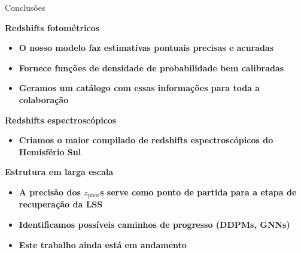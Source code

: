 
\begin{frame}[c]{Conclusões}
    \small
    \vspace*{0.2cm}
    \begin{splusbox}{\textbf{Redshifts fotométricos}}
        \begin{itemize}
            \setlength\itemsep{.1em}
            \item \textbf{O nosso modelo faz estimativas pontuais precisas e acuradas}
            \item \textbf{Fornece funções de densidade de probabilidade bem calibradas}
            \item \textbf{Geramos um catálogo com essas informações para toda a colaboração}
        \end{itemize}
    \end{splusbox}
    
    \begin{splusbox}{\textbf{Redshifts espectroscópicos}}
        \begin{itemize}
            \setlength\itemsep{.1em}
            \item \textbf{Criamos o maior compilado de redshifts espectroscópicos do Hemisfério Sul}
        \end{itemize}
    \end{splusbox}

    \begin{splusbox}{\textbf{Estrutura em larga escala}}
        \begin{itemize}
            \setlength\itemsep{.1em}
            \item \textbf{A precisão dos $z_\text{phot}$s serve como ponto de partida para a etapa de recuperação da LSS}
            \item \textbf{Identificamos possíveis caminhos de progresso (DDPMs, GNNs)}
            \item \textbf{Este trabalho ainda está em andamento}
        \end{itemize}
    \end{splusbox}
\end{frame}


